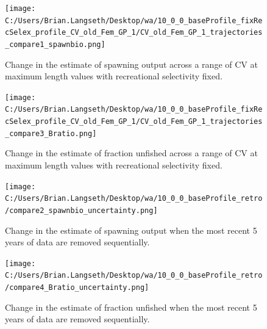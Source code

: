 \documentclass[11pt,
  english,
  letterpaper,
]{article}
\begin{document}
\tagmcend\tagstructend


\begin{figure}
\centering
\texttt{[image: C:/Users/Brian.Langseth/Desktop/wa/10\_0\_0\_baseProfile\_fixRecSelex\_profile\_CV\_old\_Fem\_GP\_1/CV\_old\_Fem\_GP\_1\_trajectories\_compare1\_spawnbio.png]}
\caption{Change in the estimate of spawning output across a range of CV at maximum length values with recreational selectivity fixed.\label{fig:cv2-recfix-ssb}}
\end{figure}

\tagmcend\tagstructend


\begin{figure}
\centering
\texttt{[image: C:/Users/Brian.Langseth/Desktop/wa/10\_0\_0\_baseProfile\_fixRecSelex\_profile\_CV\_old\_Fem\_GP\_1/CV\_old\_Fem\_GP\_1\_trajectories\_compare3\_Bratio.png]}
\caption{Change in the estimate of fraction unfished across a range of CV at maximum length values with recreational selectivity fixed.\label{fig:cv2-recfix-depl}}
\end{figure}

\tagmcend\tagstructend


\begin{figure}
\centering
\texttt{[image: C:/Users/Brian.Langseth/Desktop/wa/10\_0\_0\_baseProfile\_retro/compare2\_spawnbio\_uncertainty.png]}
\caption{Change in the estimate of spawning output when the most recent 5 years of data are removed sequentially.\label{fig:retro-ssb}}
\end{figure}

\tagmcend\tagstructend


\begin{figure}
\centering
\texttt{[image: C:/Users/Brian.Langseth/Desktop/wa/10\_0\_0\_baseProfile\_retro/compare4\_Bratio\_uncertainty.png]}
\caption{Change in the estimate of fraction unfished when the most recent 5 years of data are removed sequentially.\label{fig:retro-depl}}
\end{figure}

\tagmcend\tagstructend

\newpage
\end{document}
